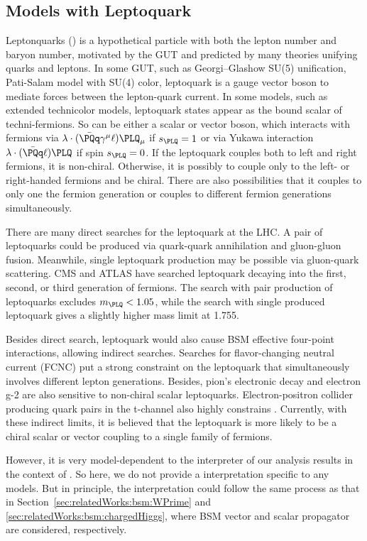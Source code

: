 \FloatBarrier


\subsection{Models with Leptoquark}
\label{sec:relatedWorks:bsm:leptoquark}


Leptonquarks (\PLQ) is a hypothetical particle with both the lepton number and baryon number, motivated by the GUT and predicted by many theories unifying quarks and leptons. In some GUT, such as Georgi–Glashow SU(5) unification, Pati-Salam model with SU(4) color, leptoquark is a gauge vector boson to mediate forces between the lepton-quark current. In some models, such as extended technicolor models, leptoquark states appear as the bound scalar of techni-fermions. So \PLQ can be either a scalar or vector boson, which interacts with fermions via $\lambda \cdot (\bar{\PQq} \gamma^\mu \ell) \PLQ_\mu$ if $s_{\PLQ}=1$ or via Yukawa interaction $\lambda \cdot (\bar{\PQq}\ell) \PLQ $ if spin $s_{\PLQ}=0$. If the leptoquark couples both to left and right fermions, it is non-chiral. Otherwise, it is possibly to couple only to the left- or right-handed fermions and be chiral. There are also possibilities that it couples to only one the fermion generation or couples to different fermion generations simultaneously. 

There are many direct searches for the leptoquark at the LHC. A pair of leptoquarks could be produced via quark-quark annihilation and gluon-gluon fusion. Meanwhile, single leptoquark production may be possible via gluon-quark scattering. CMS and ATLAS have searched leptoquark decaying into the first, second, or third generation of fermions. The search with pair production of leptoquarks excludes $m_{\PLQ}<1.05$\TeV, while the search with single produced leptoquark gives a slightly higher mass limit at 1.755\TeV. 

Besides direct search, leptoquark would also cause BSM effective four-point interactions, allowing indirect searches. Searches for flavor-changing neutral current (FCNC) put a strong constraint on the leptoquark that simultaneously involves different lepton generations. Besides, pion's electronic decay and electron g-2 are also sensitive to non-chiral scalar leptoquarks. Electron-positron collider producing quark pairs in the t-channel also highly constrains \PLQ.  Currently, with these indirect limits, it is believed that the leptoquark is more likely to be a chiral scalar or vector coupling to a single family of fermions.

However, it is very model-dependent to the interpreter of our analysis results in the context of \PLQ. So here, we do not provide a interpretation specific to any \PLQ models. But in principle, the interpretation could follow the same process as that in Section~\ref{sec:relatedWorks:bsm:WPrime} and \ref{sec:relatedWorks:bsm:chargedHiggs}, where BSM vector and scalar propagator are considered, respectively.



